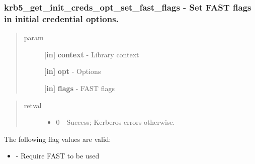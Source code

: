 \documentclass[letterpaper,10pt,english]{sphinxmanual}
\begin{document}
\subsubsection{krb5\_get\_init\_creds\_opt\_set\_fast\_flags -  Set FAST flags in initial credential options.}
\label{appdev/refs/api/krb5_get_init_creds_opt_set_fast_flags:krb5-get-init-creds-opt-set-fast-flags-set-fast-flags-in-initial-credential-options}\label{appdev/refs/api/krb5_get_init_creds_opt_set_fast_flags::doc}

\begin{fulllineitems}
\label{appdev/refs/api/krb5_get_init_creds_opt_set_fast_flags:c.krb5_get_init_creds_opt_set_fast_flags}
\end{fulllineitems}

\begin{quote}\begin{description}
\item[{param}] \leavevmode
\textbf{{[}in{]}} \textbf{context} - Library context

\textbf{{[}in{]}} \textbf{opt} - Options

\textbf{{[}in{]}} \textbf{flags} - FAST flags

\end{description}\end{quote}
\begin{quote}\begin{description}
\item[{retval}] \leavevmode\begin{itemize}
\item {} 
0   - Success; Kerberos errors otherwise.

\end{itemize}

\end{description}\end{quote}

The following flag values are valid:
\begin{itemize}
\item {} 
{\hyperref[appdev/refs/macros/KRB5_FAST_REQUIRED:KRB5_FAST_REQUIRED]{}} - Require FAST to be used

\end{itemize}
\end{document}
